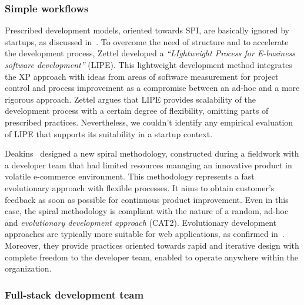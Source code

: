 \documentclass[10pt,journal,letterpaper,compsoc]{IEEEtran}
\begin{document}
\subsubsection{Simple workflows} Prescribed development models, oriented towards
SPI, are basically ignored by startups, as discussed in~\cite{Zettel2001}.
To overcome the need of structure and to accelerate the development process, 
Zettel developed a \textit{``LIghtweight Process for E-business software 
development''} (LIPE).
This lightweight development method integrates the XP approach with ideas from
areas of software measurement for project control and process improvement as a
compromise between an ad-hoc and a more rigorous approach. Zettel argues that
LIPE provides scalability of the development process with a certain degree of
flexibility, omitting parts of prescribed practices. Nevertheless, we couldn't
identify any empirical evaluation of LIPE that supports its suitability in a
startup context.


Deakins~\cite{Deakins2005} designed a new spiral methodology, constructed
during a fieldwork with a developer team that had limited resources managing an
innovative product in volatile e-commerce environment. This methodology
represents a fast evolutionary approach with flexible processes. It aims to
obtain customer's feedback as soon as possible for continuous product
improvement.%
Even in this case, the spiral methodology%
is compliant with the nature of a random, ad-hoc and \textit{evolutionary 
development approach} (CAT2). Evolutionary development approaches are 
typically more suitable for web applications, as confirmed 
in~\cite{Deshpande2001}. Moreover, they provide practices oriented towards rapid 
and iterative design with complete freedom to the developer team, enabled to 
operate anywhere within the organization. 

\subsubsection{Full-stack development team}
\end{document}
